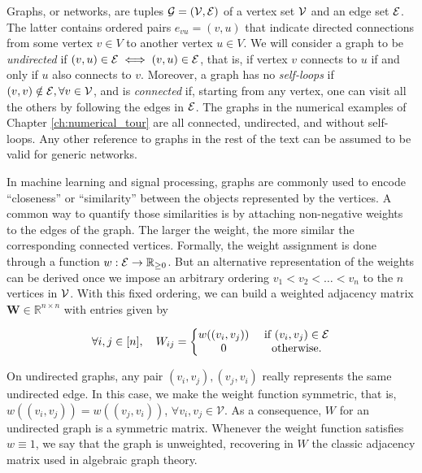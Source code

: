 Graphs, or networks, are tuples $\mathcal{G} = (\mathcal{V}, \mathcal{E})$ of a vertex set $\mathcal{V}$ and an edge set $\mathcal{E}$. The latter contains ordered pairs $e_{vu} = (v, u)$ that indicate directed connections from some vertex $v \in V$ to another vertex $u \in V$. We will consider a graph to be \textit{undirected} if $(v, u) \in \mathcal{E} \iff (v, u) \in \mathcal{E}$, that is, if vertex $v$ connects to $u$ if and only if $u$ also connects to $v$. Moreover, a graph has no \emph{self-loops} if $(v, v) \notin \mathcal{E}, \forall v \in \mathcal{V}$, and is \emph{connected} if, starting from any vertex, one can visit all the others by following the edges in $\mathcal{E}$. The graphs in the numerical examples of Chapter \ref{ch:numerical_tour} are all connected, undirected, and without self-loops. Any other reference to graphs in the rest of the text can be assumed to be valid for generic networks.

In machine learning and signal processing, graphs are commonly used to encode ``closeness'' or ``similarity'' between the objects represented by the vertices. A common way to quantify those similarities is by attaching non-negative weights to the edges of the graph. The larger the weight, the more similar the corresponding connected vertices. Formally, the weight assignment is done through a function $w : \mathcal{E} \to \mathbb{R}_{\ge 0}$. But an alternative representation of the weights can be derived once we impose an arbitrary ordering $v_1 < v_2 < \dots < v_n$ to the $n$ vertices in $\mathcal{V}$. With this fixed ordering, we can build a weighted adjacency matrix $\mathbf{W} \in \mathbb{R}^{n \times n}$ with entries given by

\begin{equation*}
    \forall i,j \in [n], \quad W_{ij} = \left \{
        \begin{matrix}
            w((v_i, v_j)) & \text{ if } (v_i, v_j) \in \mathcal{E} \\
            0 & \text{ otherwise}.
        \end{matrix}
    \right.
\end{equation*}

On undirected graphs, any pair $(v_i, v_j), (v_j, v_i)$ really represents the same undirected edge. In this case, we make the weight function symmetric, that is, $w((v_i, v_j)) = w((v_j, v_i))$, $\forall v_i, v_j \in \mathcal{V}$. As a consequence, $W$ for an undirected graph is a symmetric matrix. Whenever the weight function satisfies $w \equiv 1$, we say that the graph is unweighted, recovering in $W$ the classic adjacency matrix used in algebraic graph theory.

